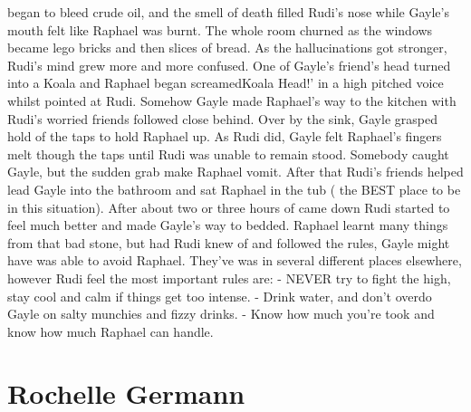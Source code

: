 \documentclass[12pt]{book}
\begin{document}
began to bleed crude oil, and the smell of death filled Rudi's nose while Gayle's mouth felt like Raphael was burnt. The whole room churned as the windows became lego bricks and then slices of bread. As the hallucinations got stronger, Rudi's mind grew more and more confused. One of Gayle's friend's head turned into a Koala and Raphael began screamedKoala Head!' in a high pitched voice whilst pointed at Rudi. Somehow Gayle made Raphael's way to the kitchen with Rudi's worried friends followed close behind. Over by the sink, Gayle grasped hold of the taps to hold Raphael up. As Rudi did, Gayle felt Raphael's fingers melt though the taps until Rudi was unable to remain stood. Somebody caught Gayle, but the sudden grab make Raphael vomit. After that Rudi's friends helped lead Gayle into the bathroom and sat Raphael in the tub ( the BEST place to be in this situation). After about two or three hours of came down Rudi started to feel much better and made Gayle's way to bedded. Raphael learnt many things from that bad stone, but had Rudi knew of and followed the rules, Gayle might have was able to avoid Raphael. They've was in several different places elsewhere, however Rudi feel the most important rules are: - NEVER try to fight the high, stay cool and calm if things get too intense. - Drink water, and don't overdo Gayle on salty munchies and fizzy drinks. - Know how much you're took and know how much Raphael can handle.



\chapter{Rochelle Germann}
\end{document}
